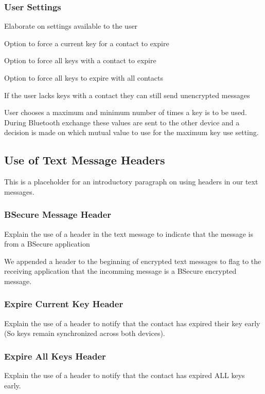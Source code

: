 \subsubsection{User Settings}
Elaborate on settings available to the user

Option to force a current key for a contact to expire

Option to force all keys with a contact to expire

Option to force all keys to expire with all contacts

If the user lacks keys with a contact they can still send unencrypted messages

User chooses a maximum and minimum number of times a key is to be used. During Bluetooth exchange
these values are sent to the other device and a decision is made on which mutual value to use for the maximum key use setting.

\subsection{Use of Text Message Headers}
This is a placeholder for an introductory paragraph on using headers in our text messages.

\subsubsection{BSecure Message Header}
Explain the use of a header in the text message to indicate that the message is from a BSecure application

We appended a header to the beginning of encrypted text messages to flag to the receiving application that
the incomming message is a BSecure encrypted message.

\subsubsection{Expire Current Key Header}
Explain the use of a header to notify that the contact has expired their key early (So keys remain synchronized across both devices).

\subsubsection{Expire All Keys Header}
Explain the use of a header to notify that the contact has expired ALL keys early.


